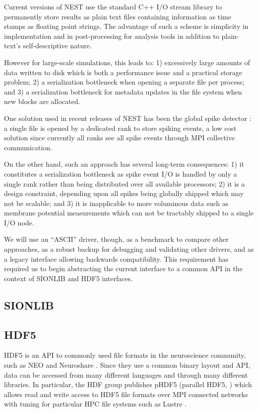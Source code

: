 \documentclass[]{YIC2015}
\begin{document}
Current versions of NEST use the standard C++ I/O stream library
\cite{stream} to permanently store results as plain text files
containing information as time stamps as floating point strings. The
advantage of such a scheme is simplicity in implementation and in
post-processing for analysis tools in addition to plain-text's
self-descriptive nature.

However for large-scale simulations, this leads to: 1) excessively
large amounts of data written to disk which is both a performance
issue and a practical storage problem; 2) a serialization bottleneck
when opening a separate file per process; and 3) a serialization
bottleneck for metadata updates in the file system when new blocks are
allocated.

One solution used in recent releases of NEST has been the global spike
detector \cite{gsd}: a single file is opened by a dedicated rank to
store spiking events, a low cost solution since currently all ranks
see all spike events through MPI collective communication.

On the other hand, such an approach has several long-term
consequences: 1) it constitutes a serialization bottleneck as spike
event I/O is handled by only a single rank rather than being
distributed over all available processors; 2) it is a design
constraint, depending upon all spikes being globally shipped which may
not be scalable; and 3) it is inapplicable to more voluminous data
such as membrane potential measurements which can not be tractably
shipped to a single I/O node.

We will use an ``ASCII'' driver, though, as a benchmark to compare
other approaches, as a robust backup for debugging and validating
other drivers, and as a legacy interface allowing backwards
compatibility. This requirement has required us to begin abstracting
the current interface to a common API in the context of SIONLIB and
HDF5 interfaces.

\subsection{SIONLIB}

\subsection{HDF5}

HDF5 is an API to commonly used file formats in the neuroscience
community, such as NEO \cite{neo} and Neuroshare \cite{neuroshare}.
Since they use a common binary layout and API, data can be accessed
from many different languages and through many different libraries. In
particular, the HDF group publishes pHDF5 (parallel HDF5, \cite{hdf5})
which allows read and write access to HDF5 file formats over MPI
connected networks with tuning for particular HPC file systems such as
Lustre \cite{lustre}.
\end{document}

